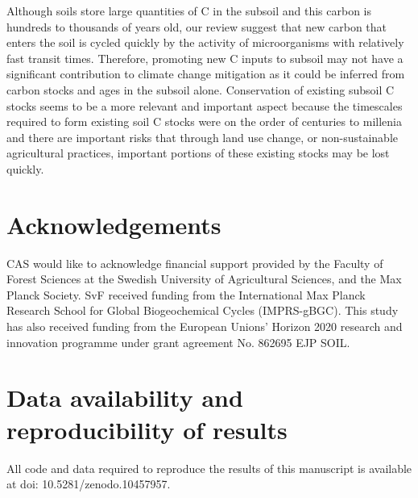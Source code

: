 \documentclass[11pt, oneside, a4paper]{article}   	%
\begin{document}
Although soils store large quantities of C in the subsoil and this carbon is hundreds to thousands of years old, our review suggest that new carbon that enters the soil is cycled quickly by the activity of microorganisms with relatively fast transit times. Therefore, promoting new C inputs to subsoil may not have a significant contribution to climate change mitigation as it could be inferred from carbon stocks and ages in the subsoil alone. Conservation of existing subsoil C stocks seems to be a more relevant and important aspect because the timescales required to form existing soil C stocks were on the order of centuries to millenia and there are important risks that through land use change, or non-sustainable agricultural practices, important portions of these existing stocks may be lost quickly. 

\section*{Acknowledgements}
CAS would like to acknowledge financial support provided by the Faculty of Forest Sciences at the Swedish University of Agricultural Sciences, and the Max Planck Society. SvF received funding from the International Max Planck Research School for Global Biogeochemical Cycles (IMPRS-gBGC). This study has also received funding from the European Unions’ Horizon 2020 research and innovation programme under grant agreement No. 862695 EJP SOIL.

\section*{Data availability and reproducibility of results}
All code and data required to reproduce the results of this manuscript is available at doi: 10.5281/zenodo.10457957. 




\end{document}
